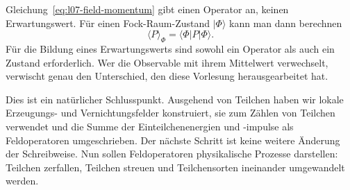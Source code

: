 Gleichung~\eqref{eq:l07-field-momentum} gibt einen Operator an, keinen Erwartungswert. Für einen Fock-Raum-Zustand \(|\Phi\rangle\) kann man dann berechnen
\begin{equation}
\langle P\rangle_\Phi=\langle\Phi|P|\Phi\rangle.
\end{equation}
Für die Bildung eines Erwartungswerts sind sowohl ein Operator als auch ein Zustand erforderlich. Wer die Observable mit ihrem Mittelwert verwechselt, verwischt genau den Unterschied, den diese Vorlesung herausgearbeitet hat.

\begin{classroomqa}
\end{classroomqa}

Dies ist ein natürlicher Schlusspunkt. Ausgehend von Teilchen haben wir lokale Erzeugungs- und Vernichtungsfelder konstruiert, sie zum Zählen von Teilchen verwendet und die Summe der Einteilchenenergien und -impulse als Feldoperatoren umgeschrieben. Der nächste Schritt ist keine weitere Änderung der Schreibweise. Nun sollen Feldoperatoren physikalische Prozesse darstellen: Teilchen zerfallen, Teilchen streuen und Teilchensorten ineinander umgewandelt werden.